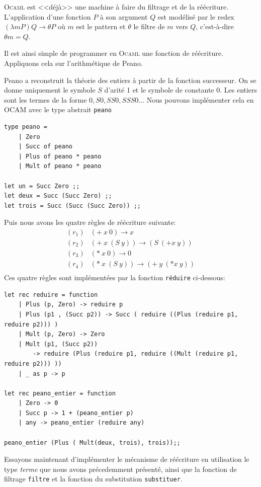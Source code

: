 \textsc{Ocaml} est <<déjà>> une machine à faire du filtrage et de la réécriture. 
L'application d'une fonction $P$ à son argument $Q$ est modélisé par le redex
$(\lambda m P)Q \longrightarrow \theta P$ où $m$ est le pattern et $\theta$ le filtre de
$m$ vers $Q$, c'est-à-dire $\theta m = Q$.	


Il est ainsi simple de programmer en \textsc{Ocaml} une fonction de réécriture.
Appliquons cela sur l'arithmétique de Peano.

Peano a reconstruit la théorie des
entiers à partir de la fonction successeur. On se donne uniquement le symbole
$S$ d'arité 1 et le symbole de constante 0.
Les entiers sont les termes de la forme $0, S0, SS0, SSS0 \ldots$
Nous pouvons implémenter cela en OCAM avec le type abstrait \texttt{peano}
\begin{verbatim}
type peano = 
	| Zero
	| Succ of peano
	| Plus of peano * peano
	| Mult of peano * peano

let un = Succ Zero ;;
let deux = Succ (Succ Zero) ;;
let trois = Succ (Succ (Succ Zero)) ;;
\end{verbatim}

Puis nous avons les quatre règles de réécriture suivante:
$$
\begin{array}{ll}
(r_1) & (+\ x\ 0) \rightarrow x \\
(r_2) & (+\  x\ (S\ y)) \to (S\ (+x\ y)) \\
(r_3) & (*\ x\ 0) \to 0 \\
(r_4) & (*\ x\ (S\ y)) \to (+\ y\ (* x\ y)) \\
\end{array}
$$
Ces quatre règles sont implémentées par la fonction \texttt{réduire} ci-dessous:
\begin{verbatim}
let rec reduire = function
	| Plus (p, Zero) -> reduire p
	| Plus (p1 , (Succ p2)) -> Succ ( reduire ((Plus (reduire p1, reduire p2))) )
	| Mult (p, Zero) -> Zero
	| Mult (p1, (Succ p2)) 
	    -> reduire (Plus (reduire p1, reduire ((Mult (reduire p1, reduire p2))) ))
	| _ as p -> p 

let rec peano_entier = function
	| Zero -> 0
	| Succ p -> 1 + (peano_entier p)
	| any -> peano_entier (reduire any)
	
peano_entier (Plus ( Mult(deux, trois), trois));;
\end{verbatim}

Essayons maintenant d'implémenter le mécanisme de réécriture en utilisation le type 
\textit{terme} que nous avons précedemment présenté, ainsi que la fonction de filtrage \texttt{filtre} et 
la fonction du substitution \texttt{substituer}.


